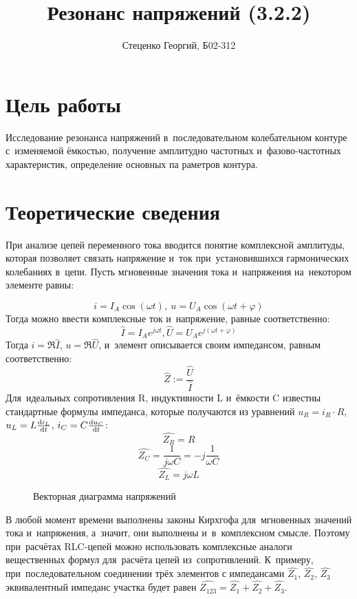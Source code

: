 \documentclass[12pt, a4paper]{article}
\title{Резонанс напряжений (3.2.2)}
\author{Стеценко Георгий, Б02-312}
\date{}
\begin{document}
\maketitle

\section{Цель работы}
Исследование резонанса напряжений в~последовательном
колебательном контуре с~изменяемой ёмкостью, получение амплитудно­
частотных и~фазово-частотных характеристик, определение основных па­
раметров контура.

\section{Теоретические сведения}
При анализе цепей переменного тока вводится понятие комплексной амплитуды, которая позволяет связать напряжение и~ток при~установившихся гармонических колебаниях в~цепи. Пусть мгновенные значения тока и~напряжения на~некотором элементе равны:

$$ i = I_A \cos(\omega t),~u = U_A \cos (\omega t + \varphi)$$
Тогда можно ввести комплексные ток и~напряжение, равные соответственно:
$$\hat{I} = I_A e^{j\omega t}, \hat{U} = U_A e^{j(\omega t + \varphi)}$$
Тогда $i=\Re \hat{I}$, $u = \Re \hat{U}$, и~элемент описывается своим импедансом, равным соответственно:
$$\hat{Z} := \frac{\hat{U}}{\hat{I}}$$
Для~идеальных сопротивления R, индуктивности L и~ёмкости C известны стандартные формулы импеданса, которые получаются из уравнений $u_R = i_R \cdot R$, $u_L = L\frac{\mathrm{d}i_L}{\mathrm{d}t}$, $i_C = C\frac{\mathrm{d}u_C}{\mathrm{d}t}$:
$$ \hat{Z_R} = R$$
$$\hat{Z_C} = \frac{1}{j\omega C} = -j \frac{1}{\omega C}$$
$$\hat{Z_L} = j\omega L$$

\begin{figure}\vspace{-15mm}
  \centering
  \caption{Векторная диаграмма напряжений}
  \label{udiag}
\end{figure}
В любой момент времени выполнены законы Кирхгофа для~мгновенных значений тока и~напряжения, а~значит, они выполнены и~в~комплексном смысле. Поэтому при~расчётах RLC-цепей можно использовать комплексные аналоги вещественных формул для~расчёта цепей из~сопротивлений. К~примеру, при~последовательном соединении трёх элементов с импедансами $\hat{Z_1}$, $\hat{Z_2}$, $\hat{Z_3}$ эквивалентный импеданс участка будет равен $\widehat{Z_{123}} = \hat{Z_1} + \hat{Z_2} + \hat{Z_3}$.
\end{document}
